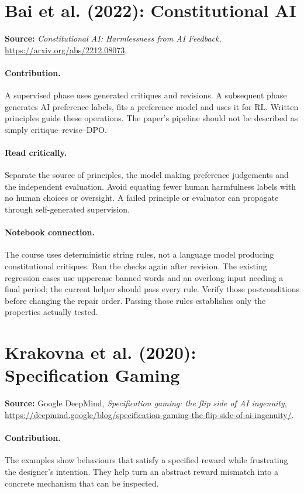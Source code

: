 \documentclass[11pt]{scrartcl}
\begin{document}
\section{Bai et al. (2022): Constitutional AI}
\textbf{Source:} \emph{Constitutional AI: Harmlessness from AI Feedback},
\url{https://arxiv.org/abs/2212.08073}.

\paragraph{Contribution.} A supervised phase uses generated critiques and
revisions. A subsequent phase generates AI preference labels, fits a preference
model and uses it for RL. Written principles guide these operations. The paper's
pipeline should not be described as simply critique--revise--DPO.

\paragraph{Read critically.} Separate the source of principles, the model
making preference judgements and the independent evaluation. Avoid equating
fewer human harmfulness labels with no human choices or oversight. A failed
principle or evaluator can propagate through self-generated supervision.

\paragraph{Notebook connection.} The course uses deterministic string rules,
not a language model producing constitutional critiques. Run the checks again
after revision. The existing regression cases use uppercase banned words and
an overlong input needing a final period; the current helper should pass
every rule. Verify those postconditions before changing the repair order.
Passing those rules establishes only the properties actually tested.

\section{Krakovna et al. (2020): Specification Gaming}
\textbf{Source:} Google DeepMind, \emph{Specification gaming: the flip side of AI ingenuity},
\url{https://deepmind.google/blog/specification-gaming-the-flip-side-of-ai-ingenuity/}.

\paragraph{Contribution.} The examples show behaviours that satisfy a specified
reward while frustrating the designer's intention. They help turn an abstract
reward mismatch into a concrete mechanism that can be inspected.
\end{document}
